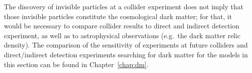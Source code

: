 \documentclass[../report.tex]{subfiles}
\begin{document}
The discovery of invisible particles at a collider experiment does not imply that those invisible particles constitute the cosmological dark matter; for that, it would be necessary to compare collider results to direct and indirect detection experiment, as well as to astrophysical observations (e.g.\ the dark matter relic density). The comparison of the sensitivity of experiments at future colliders and direct/indirect detection experiments searching for dark matter for the models in this section can be found in Chapter~\ref{chap:dm}. 
\end{document}
